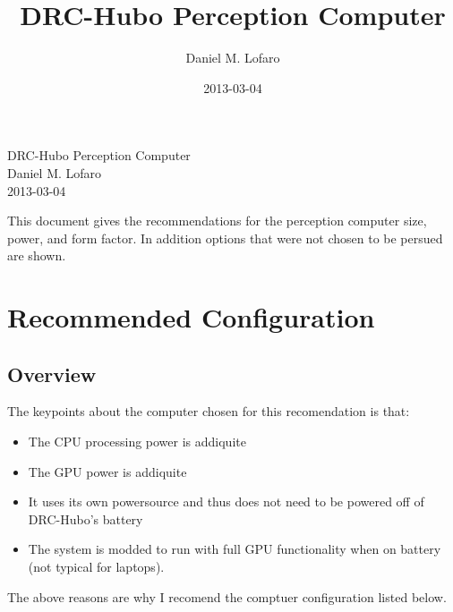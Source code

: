 \documentclass{article}
\begin{document}
\title{DRC-Hubo Perception Computer}
\author{Daniel M. Lofaro}
\date{2013-03-04}

\begin{center}
\Large DRC-Hubo Perception Computer\\
\large
Daniel M. Lofaro\\
2013-03-04\\
\end{center}
\normalsize
This document gives the recommendations for the perception computer size, power, and form factor.
In addition options that were not chosen to be persued are shown.

\section{Recommended Configuration}
\subsection{Overview}
The keypoints about the computer chosen for this recomendation is that:
\begin{itemize}
\item The CPU processing power is addiquite
\item The GPU power is addiquite
\item It uses its own powersource and thus does not need to be powered off of DRC-Hubo's battery
\item The system is modded to run with full GPU functionality when on battery (not typical for laptops).
\end{itemize}

The above reasons are why I recomend the comptuer configuration listed below.
\end{document}
